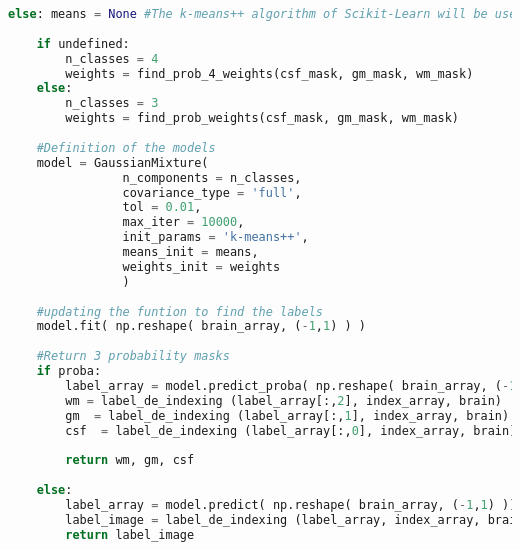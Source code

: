 \documentclass{standalone}
\begin{document}
\begin{lstlisting}[language = python, caption = Segmentation pipeline, label =segmentation]
    else: means = None #The k-means++ algorithm of Scikit-Learn will be used to initialize the means
    
    if undefined:
        n_classes = 4
        weights = find_prob_4_weights(csf_mask, gm_mask, wm_mask)
    else:
        n_classes = 3
        weights = find_prob_weights(csf_mask, gm_mask, wm_mask)
        
    #Definition of the models    
    model = GaussianMixture(
                n_components = n_classes,
                covariance_type = 'full',
                tol = 0.01,
                max_iter = 10000,
                init_params = 'k-means++',
                means_init = means,
                weights_init = weights
                )
    
    #updating the funtion to find the labels
    model.fit( np.reshape( brain_array, (-1,1) ) )
    
    #Return 3 probability masks
    if proba:
        label_array = model.predict_proba( np.reshape( brain_array, (-1,1) ) )
        wm = label_de_indexing (label_array[:,2], index_array, brain)
        gm  = label_de_indexing (label_array[:,1], index_array, brain)
        csf  = label_de_indexing (label_array[:,0], index_array, brain)
        
        return wm, gm, csf
    
    else:
        label_array = model.predict( np.reshape( brain_array, (-1,1) ))
        label_image = label_de_indexing (label_array, index_array, brain, 1.)
        return label_image

\end{lstlisting}
\end{document}
